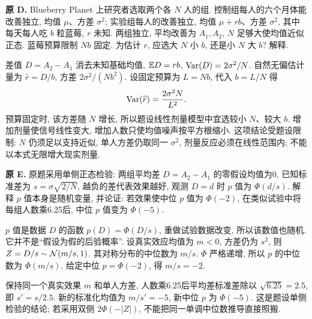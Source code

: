 \begin{exercise}\label{ex:P9.D}\label{part:P9.D}
\textbf{原 D.} Blueberry Planet 上研究者选取两个各 $N$ 人的组. 控制组每人的六个月体能改善独立, 均值 $\mu$、方差 $\sigma^2$; 实验组每人的改善独立, 均值 $\mu+rb$、方差 $\sigma^2$, 其中每天每人吃 $b$ 粒蓝莓, $r$ 未知. 两组独立, 平均改善为 $A_1,A_2$, $N$ 足够大使均值近似正态. 蓝莓预算限制 $Nb$ 固定. 为估计 $r$, 应选大 $N$ 小 $b$, 还是小 $N$ 大 $b$? 解释.
\end{exercise}
\begin{solution}\label{sol:P9.D}
差值 $D=A_2-A_1$ 消去未知基础均值, $\mathbb E D=rb$, $\operatorname{Var}(D)=2\sigma^2/N$. 自然无偏估计量为 $\widehat r=D/b$, 方差 $2\sigma^2/(Nb^2)$. 设固定预算为 $L=Nb$, 代入 $b=L/N$ 得
\[
 \operatorname{Var}(\widehat r)=\frac{2\sigma^2N}{L^2}.
\]
预算固定时, 该方差随 $N$ 增长, 所以题设线性剂量模型中宜选较小 $N$、较大 $b$. 增加剂量使信号线性变大, 增加人数只使均值噪声按平方根缩小. 这项结论受题设限制: $N$ 仍须足以支持近似, 单人方差仍取同一 $\sigma^2$, 剂量反应必须在线性范围内; 不能以本式无限增大现实剂量.
\end{solution}

\begin{exercise}\label{ex:P9.E}\label{part:P9.E}
\textbf{原 E.} 原题采用单侧正态检验: 两组平均差 $D=A_2-A_1$ 的零假设均值为0, 已知标准差为 $s=\sigma\sqrt{2/N}$, 越负的差代表效果越好, 观测 $D=d$ 时 $p$ 值为 $\Phi(d/s)$. 解释 $p$ 值本身是随机变量, 并论证: 若效果使中位 $p$ 值为 $\Phi(-2)$, 在类似试验中将每组人数乘6.25后, 中位 $p$ 值变为 $\Phi(-5)$.
\end{exercise}
\begin{solution}\label{sol:P9.E}
$p$ 值是数据 $D$ 的函数 $p(D)=\Phi(D/s)$, 重做试验数据改变, 所以该数值也随机. 它并不是“假设为假的后验概率”. 设真实效应均值为 $m<0$, 方差仍为 $s^2$, 则 $Z=D/s\sim\mathcal N(m/s,1)$. 其对称分布的中位数为 $m/s$. $\Phi$ 严格递增, 所以 $p$ 的中位数为 $\Phi(m/s)$. 给定中位 $p=\Phi(-2)$, 得 $m/s=-2$.

保持同一个真实效果 $m$ 和单人方差, 人数乘6.25后平均差标准差除以 $\sqrt{6.25}=2.5$, 即 $s'=s/2.5$. 新的标准化均值为 $m/s'=-5$, 新中位 $p$ 为 $\Phi(-5)$. 这是题设单侧检验的结论; 若采用双侧 $2\Phi(-|Z|)$, 不能把同一单调中位数推导直接照搬.
\end{solution}

